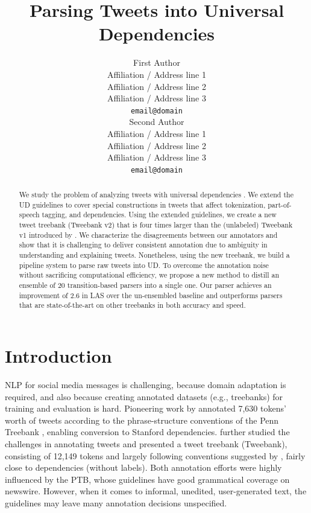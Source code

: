 \documentclass[11pt,a4paper]{article}
\title{Parsing Tweets into Universal Dependencies}
\author{First Author \\
  Affiliation / Address line 1 \\
  Affiliation / Address line 2 \\
  Affiliation / Address line 3 \\
  {\tt email@domain} \\\And
  Second Author \\
  Affiliation / Address line 1 \\
  Affiliation / Address line 2 \\
  Affiliation / Address line 3 \\
  {\tt email@domain} \\}
\date{}
\begin{document}
\maketitle
\begin{abstract}
We study the problem of analyzing tweets with
universal dependencies \citep[UD;][]{NIVRE16.348}. We extend the UD guidelines to cover
special constructions in tweets that affect tokenization,
part-of-speech tagging, and dependencies. Using the extended guidelines, we create
a new tweet treebank ({\sc Tweebank v2}) that is four times larger than the (unlabeled) {\sc Tweebank
  v1} introduced by \citet{kong-EtAl:2014:EMNLP2014}. 
We characterize the disagreements between our annotators
and show that it is challenging to deliver
consistent annotation due to ambiguity in
understanding and explaining tweets. Nonetheless, using the new treebank,
we build a pipeline system to parse raw tweets into UD. To overcome the
annotation noise without sacrificing computational efficiency, we propose a new
method to distill an ensemble of 20 transition-based parsers into a single one. Our
parser achieves an improvement of 2.6 in LAS over the un-ensembled baseline 
and outperforms parsers that are state-of-the-art on other treebanks in both accuracy and speed.
\end{abstract}

\section{Introduction}
NLP for social media messages is challenging, because domain
adaptation is required, and also because creating annotated datasets
(e.g., treebanks)
for training and evaluation is hard. 
Pioneering work by \citet{AAAIW113912} 
annotated 7,630 tokens' worth of tweets according to the
phrase-structure conventions of the Penn Treebank
\citep[PTB;][]{Marcus93buildinga}, enabling conversion to Stanford dependencies.
\citet{kong-EtAl:2014:EMNLP2014} further studied the challenges in
annotating tweets and presented a tweet treebank ({\sc Tweebank}),
consisting of 12,149 tokens and largely following conventions
suggested by \citet{schneider-EtAl:2013:LAW7-ID}, fairly close to 
\citet{Yamada03statisticaldependency} dependencies (without labels). 
Both annotation efforts were highly influenced by the PTB, whose guidelines
have good grammatical coverage on newswire. However, when it comes
to informal, unedited, user-generated text, the guidelines may leave
many annotation decisions unspecified.
\end{document}
